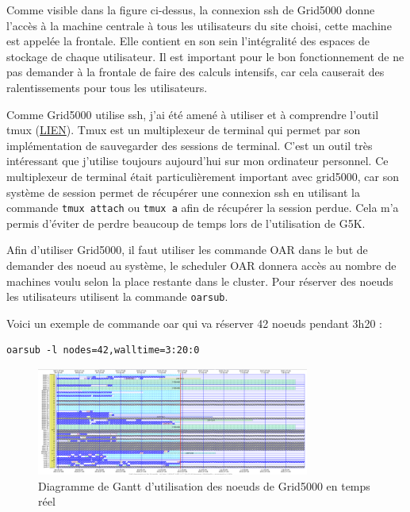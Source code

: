 \documentclass[a4paper,french,12pt, titlepage]{article}
\begin{document}
Comme visible dans la figure ci-dessus, la connexion ssh de Grid5000
donne l'accès à la machine centrale à tous les utilisateurs du site
choisi, cette machine est appelée la frontale. Elle contient en son sein
l'intégralité des espaces de stockage de chaque utilisateur. Il est
important pour le bon fonctionnement de ne pas demander à la frontale de
faire des calculs intensifs, car cela causerait des ralentissements pour
tous les utilisateurs. \newline

Comme Grid5000 utilise ssh, j'ai été amené à utiliser et à comprendre
l'outil tmux (\href{https://github.com/tmux/tmux/wiki}{LIEN}). Tmux est
un multiplexeur de terminal qui permet par son implémentation de
sauvegarder des sessions de terminal. C'est un outil très intéressant
que j'utilise toujours aujourd'hui sur mon ordinateur personnel. Ce
multiplexeur de terminal était particulièrement important avec grid5000,
car son système de session permet de récupérer une connexion ssh en
utilisant la commande \texttt{tmux\ attach} ou \texttt{tmux\ a} afin de
récupérer la session perdue. Cela m'a permis d'éviter de perdre beaucoup
de temps lors de l'utilisation de G5K.\newline

Afin d'utiliser Grid5000, il faut utiliser les commande OAR dans le but
de demander des noeud au système, le scheduler OAR donnera accès au
nombre de machines voulu selon la place restante dans le cluster. Pour
réserver des noeuds les utilisateurs utilisent la commande
\texttt{oarsub}.

Voici un exemple de commande oar qui va réserver 42 noeuds pendant 3h20
:

\begin{verbatim}
oarsub -l nodes=42,walltime=3:20:0
\end{verbatim}

\begin{figure}[h]
\centering
\includegraphics[width=0.8\textwidth,height=0.8\textheight,keepaspectratio]{images/ganttg5k.png}
\caption{Diagramme de Gantt d'utilisation des noeuds de Grid5000 en temps réel}
\end{figure}
\end{document}
